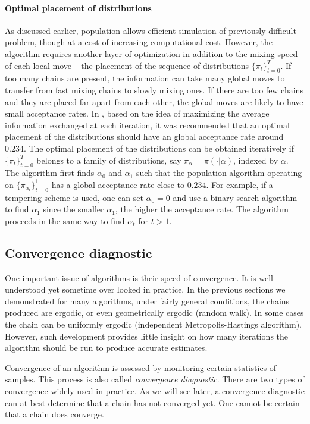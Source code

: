\paragraph{Optimal placement of distributions}

As discussed earlier, population \mcmc allows efficient simulation of previously difficult problem, though at a cost of increasing computational cost. However, the algorithm requires another layer of optimization in addition to the mixing speed of each local move -- the placement of the sequence of distributions $\{\pi_t\}_{t=0}^T$. If too many chains are present, the information can take many global moves to transfer from fast mixing chains to slowly mixing ones. If there are too few chains and they are placed far apart from each other, the global moves are likely to have small acceptance rates. In \cite{Atchade:2010ha}, based on the idea of maximizing the average information exchanged at each iteration, it was recommended that an optimal placement of the distributions should have an global acceptance rate around $0.234$. The optimal placement of the distributions can be obtained iteratively if $\{\pi_t\}_{t=0}^T$ belongs to a family of distributions, say $\pi_{\alpha} = \pi(\cdot|\alpha)$, indexed by $\alpha$. The algorithm first finds $\alpha_0$ and $\alpha_1$ such that the population \mcmc algorithm operating on $\{\pi_{\alpha_t}\}_{t=0}^1$ has a global acceptance rate close to $0.234$. For example, if a tempering scheme is used, one can set $\alpha_0 = 0$ and use a binary search algorithm to find $\alpha_1$ since the smaller $\alpha_1$, the higher the acceptance rate. The algorithm proceeds in the same way to find $\alpha_t$ for $t>1$.

\subsection{Convergence diagnostic}
\label{sub:Convergence diagnostic}

One important issue of \mcmc algorithms is their speed of convergence. It is well understood yet sometime over looked in practice. In the previous sections we demonstrated for many algorithms, under fairly general conditions, the chains produced are ergodic, or even geometrically ergodic (random walk). In some cases the chain can be uniformly ergodic (independent Metropolis-Hastings algorithm). However, such development provides little insight on how many iterations the algorithm should be run to produce accurate estimates.

Convergence of an \mcmc algorithm is assessed by monitoring certain statistics of samples. This process is also called \emph{convergence diagnostic}. There are two types of convergence \cite[][chap.~12]{Robert:2004tn} widely used in practice. As we will see later, a convergence diagnostic can at best determine that a chain has not converged yet. One cannot be certain that a chain does converge.

